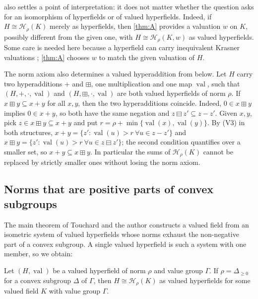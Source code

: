 \documentclass[11pt]{amsart}
\numberwithin{equation}{section}
\newcommand{\hplus}{\boxplus}
\newcommand{\hminus}{\boxminus}
\newcommand{\val}{\operatorname{val}}
\newcommand{\Hr}{\mathcal H_\rho}
\begin{document}
\begin{remark}
 also settles a point of interpretation: it does not matter whether the question asks for an isomorphism of hyperfields or of valued hyperfields. Indeed, if $H\cong\Hr(K)$ merely as hyperfields, then \cref{thm:A} provides a valuation $w$ on $K$, possibly different from the given one, with $H\cong\Hr(K,w)$ as valued hyperfields. Some care is needed here because a hyperfield can carry inequivalent Krasner valuations \cite[Example~4.24]{Linzi25}; \cref{thm:A} chooses $w$ to match the given valuation of $H$.
\end{remark}

\begin{remark}[Rigidity]\label{rem:rigid}
The norm axiom also determines a valued hyperaddition from below. Let $H$ carry two hyperadditions $+$ and $\hplus$, one multiplication and one map $\val$, such that $(H,+,\cdot,\val)$ and $(H,\hplus,\cdot,\val)$ are both valued hyperfields of norm $\rho$. If $x\hplus y\subseteq x+y$ for all $x,y$, then the two hyperadditions coincide. Indeed, $0\in x\hplus y$ implies $0\in x+y$, so both have the same negation and $z\hminus z'\subseteq z-z'$. Given $x,y$, pick $z\in x\hplus y\subseteq x+y$ and put $r=\rho+\min\{\val(x),\val(y)\}$. By (V3) in both structures, $x+y=\{z':\val(u)>r\ \forall u\in z-z'\}$ and $x\hplus y=\{z':\val(u)>r\ \forall u\in z\hminus z'\}$; the second condition quantifies over a smaller set, so $x+y\subseteq x\hplus y$. In particular the sums of $\Hr(K)$ cannot be replaced by strictly smaller ones without losing the norm axiom.
\end{remark}

\subsection*{Norms that are positive parts of convex subgroups}
The main theorem of Touchard and the author \cite[Theorem~4.1]{LT25} constructs a valued field from an isometric system of valued hyperfields whose norms exhaust the non-negative part of a convex subgroup. A single valued hyperfield is such a system with one member, so we obtain:

\begin{corollary}[{of \cite[Theorem~4.1]{LT25}}]\label{cor:convex}
Let $(H,\val)$ be a valued hyperfield of norm $\rho$ and value group $\Gamma$. If $\rho=\Delta_{\ge0}$ for a convex subgroup $\Delta$ of $\Gamma$, then $H\cong\Hr(K)$ as valued hyperfields for some valued field $K$ with value group $\Gamma$.
\end{corollary}
\end{document}
